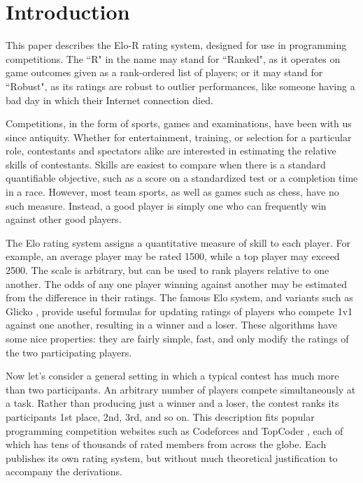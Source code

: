 
\section{Introduction}

This paper describes the Elo-R rating system, designed for use in programming competitions. The ``R" in the name may stand for ``Ranked", as it operates on game outcomes given as a rank-ordered list of players; or it may stand for ``Robust", as its ratings are robust to outlier performances, like someone having a bad day in which their Internet connection died.

Competitions, in the form of sports, games and examinations, have been with us since antiquity. Whether for entertainment, training, or selection for a particular role, contestants and spectators alike are interested in estimating the relative skills of contestants. Skills are easiest to compare when there is a standard quantifiable objective, such as a score on a standardized test or a completion time in a race.  However, most team sports, as well as games such as chess, have no such measure. Instead, a good player is simply one who can frequently win against other good players.

The Elo rating system assigns a quantitative measure of skill to each player. For example, an average player may be rated 1500, while a top player may exceed 2500. The scale is arbitrary, but can be used to rank players relative to one another. The odds of any one player winning against another may be estimated from the difference in their ratings. The famous Elo system, and variants such as Glicko \cite{glicko}, provide useful formulas for updating ratings of players who compete 1v1 against one another, resulting in a winner and a loser. These algorithms have some nice properties: they are fairly simple, fast, and only modify the ratings of the two participating players.

Now let's consider a general setting in which a typical contest has much more than two participants. An arbitrary number of players compete simultaneously at a task. Rather than producing just a winner and a loser, the contest ranks its participants 1st place, 2nd, 3rd, and so on. This description fits popular programming competition websites such as Codeforces \cite{Codeforces} and TopCoder \cite{TopCoder}, each of which has tens of thousands of rated members from across the globe. Each publishes its own rating system, but without much theoretical justification to accompany the derivations.

